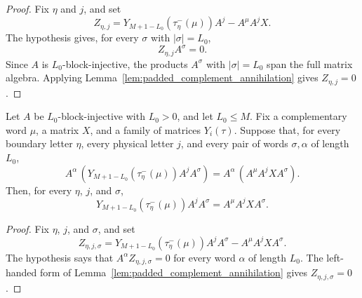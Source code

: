 \begin{proof}
    \leanok
    Fix $\eta$ and $j$, and set
    \[
        Z_{\eta,j}
        =
        Y_{M+1-L_0}(\tau^-_\eta(\mu))A^j-A^\mu A^jX .
    \]
    The hypothesis gives, for every $\sigma$ with $|\sigma|=L_0$,
    \[
        Z_{\eta,j}A^\sigma=0.
    \]
    Since $A$ is $L_0$-block-injective, the products $A^\sigma$ with
    $|\sigma|=L_0$ span the full matrix algebra.  Applying
    Lemma~\ref{lem:padded_complement_annihilation} gives $Z_{\eta,j}=0$.
\end{proof}

\begin{lemma}
    \label{lem:closure_property_opposite_boundary_comparison_from_left_words}
    \leanok
    Let $A$ be $L_0$-block-injective with $L_0>0$, and let $L_0\le M$.
    Fix a complementary word $\mu$, a matrix $X$, and a family of matrices
    $Y_i(\tau)$. Suppose that, for every boundary letter $\eta$, every physical
    letter $j$, and every pair of words $\sigma,\alpha$ of length $L_0$,
    \[
        A^\alpha\,
        \left(Y_{M+1-L_0}(\tau^-_\eta(\mu))A^jA^\sigma\right)
        =
        A^\alpha\,\left(A^\mu A^jXA^\sigma\right).
    \]
    Then, for every $\eta$, $j$, and $\sigma$,
    \[
        Y_{M+1-L_0}(\tau^-_\eta(\mu))A^jA^\sigma
        =
        A^\mu A^jXA^\sigma .
    \]
\end{lemma}

\begin{proof}
    \leanok
    Fix $\eta$, $j$, and $\sigma$, and set
    \[
        Z_{\eta,j,\sigma}
        =
        Y_{M+1-L_0}(\tau^-_\eta(\mu))A^jA^\sigma
        -
        A^\mu A^jXA^\sigma .
    \]
    The hypothesis says that \(A^\alpha Z_{\eta,j,\sigma}=0\) for every word
    \(\alpha\) of length \(L_0\).  The left-handed form of
    Lemma~\ref{lem:padded_complement_annihilation} gives
    \(Z_{\eta,j,\sigma}=0\).
\end{proof}

